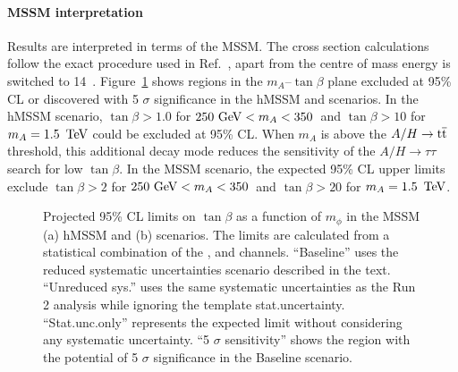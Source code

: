 
\paragraph{MSSM interpretation}
Results are interpreted in terms of the MSSM\@. The cross section calculations follow the exact procedure used in Ref.~\cite{ATLASRun2Ditau}, apart from the centre of mass energy is switched to 14~\TeV. Figure~\ref{fig:model1} shows regions in the $m_A$--$\tan\beta$ plane excluded at 95\% CL or discovered with 5 $\sigma$ significance in the hMSSM and \mhmodp scenarios. In the hMSSM scenario, $\tan\beta > 1.0$ for $250~{\rm{GeV}}< m_A < 350$~\GeV and $\tan\beta > 10$ for $m_A = 1.5~\,\text{Te\hspace{-.08em}V}$ could be excluded at 95\% CL\@. When $m_A$ is above the $A/H\to \text{t}\overline{\text{t}}$ threshold, this additional decay mode reduces the sensitivity of the $A/H\to\tau\tau$ search for low $\tan\beta$. In the MSSM \mhmodp scenario, the expected 95\% CL upper limits exclude $\tan\beta >2$ for $250~{\rm{GeV}}< m_A< 350$~\GeV and $\tan\beta > 20$ for $m_A =1.5~\,\text{Te\hspace{-.08em}V}$.

\begin{figure}[!ht]
    \centering
        \qquad
        \caption{Projected 95\% CL limits on $\tan\beta$ as a function of $m_\phi$ in the MSSM (a) hMSSM and (b) \mhmodp scenarios. The limits are calculated from a statistical combination of the \ehad, \muhad and \hadhad channels. ``Baseline'' uses the reduced systematic uncertainties scenario described in the text. ``Unreduced sys.\@'' uses the same systematic uncertainties as the Run 2 analysis while ignoring the template stat.\@ uncertainty. ``Stat.\@ unc.\@ only'' represents the expected limit without considering any systematic uncertainty. ``5 $\sigma$ sensitivity'' shows the region with the potential of 5 $\sigma$ significance in the Baseline scenario.
        }
    \label{fig:model1}
\end{figure}

